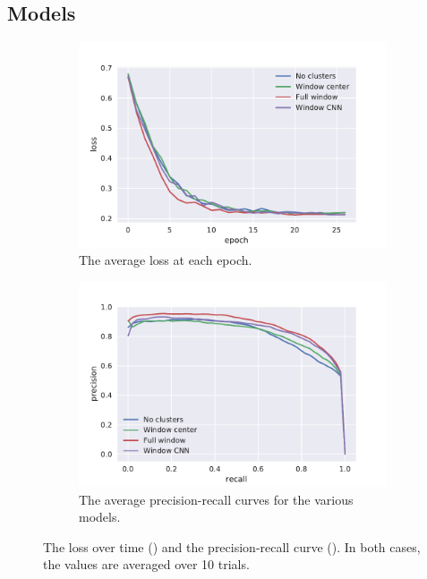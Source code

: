 \FloatBarrier%

\subsection{Models}
\begin{figure}[htbp]
  \centering
  \begin{subfigure}[t]{0.49\textwidth}
    \centering
    \includegraphics[width=\textwidth]{./figures/results/models/losses.pdf}
    \caption{The average loss at each epoch.\\}%
    \label{fig:model_loss}
  \end{subfigure}
  \begin{subfigure}[t]{0.49\textwidth}
    \centering
    \includegraphics[width=\textwidth]{./figures/results/models/pr.pdf}
    \caption{The average precision-recall curves for the various models.}%
    \label{fig:model_pr}
  \end{subfigure}
  \caption{The loss over time () and the
    precision-recall curve (). In both cases, the values are
    averaged over 10 trials.}%
    \label{fig:model_plots}
\end{figure}

